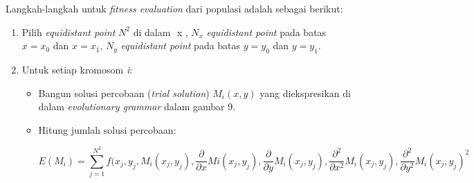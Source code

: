 \begin{enumerate}[1.]
\begin{enumerate}[1.]
		Langkah-langkah untuk \textit{fitness evaluation} dari populasi adalah sebagai berikut:

		\begin{enumerate}[1.]

			\item Pilih \textit{equidistant point} \begin{math} N^{2} \end{math} di dalam \begin{math} [x_0, x_1] \end{math} x \begin{math} [y_0, y_1] \end{math}, \begin{math} N_x \end{math} \textit{equidistant point} pada batas \begin{math} x = x_0 
			\end{math} dan \begin{math} x = x_1 \end{math}, \begin{math} N_y \end{math} \textit{equidistant point} pada batas \begin{math} y = y_0 \end{math} dan \begin{math} y = y_1 \end{math}.
			\item Untuk setiap kromosom \textit{i}:

				\begin{itemize}

					\item Bangun solusi percobaan (\textit{trial solution}) \begin{math} M_i(x, y) \end{math}  yang diekspresikan di dalam \textit{evolutionary grammar} dalam gambar 9.
					\item Hitung jumlah solusi percobaan:

					\begin{equation} E(M_i) = \sum_{j=1}^{N^{2}}f(x_j, y_j, M_i(x_j, y_j), \frac{\partial}{\partial x}Mi(x_j, y_j), \frac{\partial}{\partial y}M_i(x_j, y_j), \frac{\partial^{2}}{\partial x^{2}}M_i(x_j, y_j), \frac{\partial^{2}}{\partial y^{2}}
					M_i(x_j, y_j)^{2} 	\end{equation}


\end{itemize}
\end{enumerate}
\end{enumerate}
\end{enumerate}
